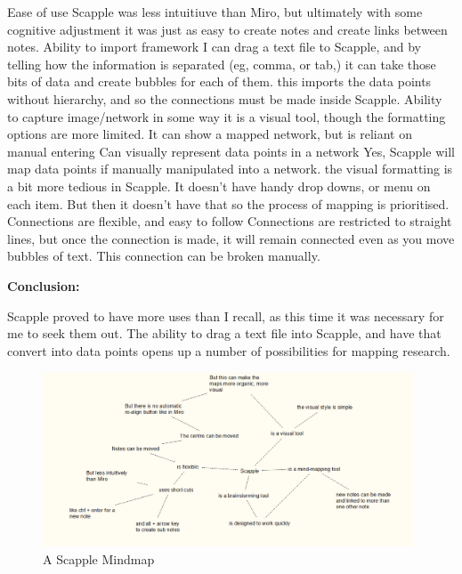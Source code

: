 \documentclass{article}
\begin{document}
\begin{outline}
    \1 Ease of use
        \2 Scapple was less intuitiuve than Miro, but ultimately with some cognitive adjustment it was just as easy to create notes and create links between notes. 
    \1 Ability to import framework
        \2 I can drag a text file to Scapple, and by telling how the information is separated (eg, comma, or tab,) it can take those bits of data and create bubbles for each of them.
        \2 this imports the data points without hierarchy, and so the connections must be made inside Scapple.
    \1 Ability to capture image/network in some way
        \2 it is a visual tool, though the formatting options are more limited. It can show a mapped network, but is reliant on manual entering
    \1 Can visually represent data points in a network
        \2 Yes, Scapple will map data points if manually manipulated into a network. 
        \2 the visual formatting is a bit more tedious in Scapple. It doesn't have handy drop downs, or menu on each item. But then it doesn't have that so the process of mapping is prioritised.
    \1 Connections are flexible, and easy to follow
        \2 Connections are restricted to straight lines, but once the connection is made, it will remain connected even as you move bubbles of text. This connection can be broken manually. 
\end{outline}

\textbf{Conclusion:}

Scapple proved to have more uses than I recall, as this time it was necessary for me to seek them out. The ability to drag a text file into Scapple, and have that convert into data points opens up a number of possibilities for mapping research.

\pagebreak

\begin{figure}[htbp]
    \centering
    \includegraphics[width=11cm]{Images/Scapple001.PNG}
    \caption{A Scapple Mindmap}
    \label{fig: Scapple Mindmap 1}
\end{figure}
\end{document}
